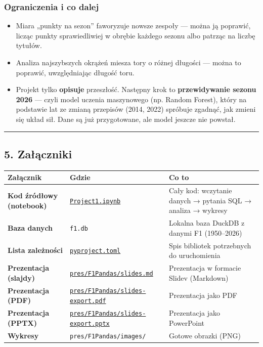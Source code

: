 \documentclass[
]{article}
\providecommand{\tightlist}{%
\setlength{\itemsep}{0pt}\setlength{\parskip}{0pt}}
\begin{document}
\subsubsection{Ograniczenia i co dalej}\label{ograniczenia-i-co-dalej}

\begin{itemize}
    \tightlist
  \item
    Miara „punkty na sezon'' faworyzuje nowsze zespoły --- można ją poprawić, licząc punkty sprawiedliwiej
    w obrębie każdego sezonu albo patrząc na liczbę tytułów.
  \item
    Analiza najszybszych okrążeń miesza tory o różnej długości --- można to poprawić, uwzględniając
    długość toru.
  \item
    Projekt tylko \textbf{opisuje} przeszłość. Następny krok to \textbf{przewidywanie sezonu 2026} --- czyli model
    uczenia maszynowego (np. Random Forest), który na podstawie lat ze zmianą przepisów (2014, 2022)
    spróbuje zgadnąć, jak zmieni się układ sił. Dane są już przygotowane, ale model jeszcze nie powstał.
\end{itemize}

\begin{center}\rule{0.5\linewidth}{0.5pt}
\end{center}

\subsection{5. Załączniki}\label{zaux142ux105czniki}

\begin{longtable}[c]{@{}
    >{\raggedright\arraybackslash}p{}
    >{\raggedright\arraybackslash}p{}
  >{\raggedright\arraybackslash}p{}@{}}
  \toprule\noalign{}
  Załącznik & Gdzie & Co to \\
  \midrule\noalign{}
  \endhead
  \bottomrule\noalign{}
  \endlastfoot
  \textbf{Kod źródłowy (notebook)} & \href{Project1.ipynb}{\texttt{Project1.ipynb}} & Cały kod: wczytanie danych → pytania SQL → analiza → wykresy \\
  \textbf{Baza danych} & \texttt{f1.db} & Lokalna baza DuckDB z danymi F1 (1950--2026) \\
  \textbf{Lista zależności} & \href{pyproject.toml}{\texttt{pyproject.toml}} & Spis bibliotek potrzebnych do uruchomienia \\
  \textbf{Prezentacja (slajdy)} & \href{pres/F1Pandas/slides.md}{\texttt{pres/F1Pandas/slides.md}} & Prezentacja w formacie Slidev (Markdown) \\
  \textbf{Prezentacja (PDF)} & \href{pres/F1Pandas/slides-export.pdf}{\texttt{pres/F1Pandas/slides-export.pdf}} & Prezentacja jako PDF \\
  \textbf{Prezentacja (PPTX)} & \href{pres/F1Pandas/slides-export.pptx}{\texttt{pres/F1Pandas/slides-export.pptx}} & Prezentacja jako PowerPoint \\
  \textbf{Wykresy} & \texttt{pres/F1Pandas/images/} & Gotowe obrazki (PNG) \\
\end{longtable}
\end{document}
